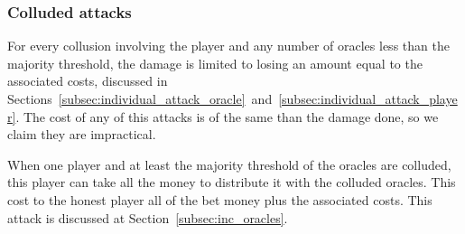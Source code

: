 \subsubsection{Colluded attacks}\label{subsec:colluded_attacks}

For every collusion involving the player and any number of oracles less than
  the majority threshold, the damage is limited to losing an amount equal to the
  associated costs, discussed in
  Sections~\ref{subsec:individual_attack_oracle}~and~\ref{subsec:individual_attack_player}.
The cost of any of this attacks is of the same than the damage done, so we claim
  they are impractical.

When one player and at least the majority threshold of the oracles are colluded,
  this player can take all the money to distribute it with the colluded oracles.
This cost to the honest player all of the bet money plus the associated costs.
This attack is discussed at Section~\ref{subsec:inc_oracles}.
